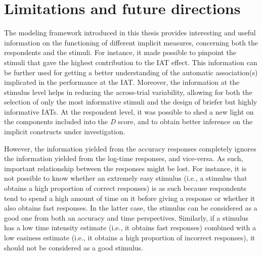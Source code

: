 \documentclass[12pt]{book}
\begin{document}
\section{Limitations and future directions}

The modeling framework introduced in this thesis provides interesting and useful information on the functioning of different implicit measures, concerning both the respondents and the stimuli. 
	For instance, it made possible to pinpoint the stimuli that gave the highest contribution to the IAT effect. This information can be further used for getting a better understanding of the automatic association(s) implicated in the performance at the IAT. 
	Moreover, the information at the stimulus level helps in reducing the across-trial variability, allowing for both the selection of only the most informative stimuli and the design of briefer but highly informative IATs.
	At the respondent level, it was possible to shed a new light on the components included into the \emph{D} score, and to obtain better inference on the implicit constructs under investigation. 


However, the information yielded from the accuracy responses completely ignores the information yielded from the log-time responses, and vice-versa. As such, important relationship between the responses might be lost. 
	For instance, it is not possible to know whether an extremely easy stimulus (i.e., a stimulus that obtains a high proportion of correct responses) is as such because respondents tend to spend a high amount of time on it before giving a response or whether it also obtains fast responses. 
	In the latter case, the stimulus can be considered as a good  one from both an accuracy and time perspectives. 
	Similarly, if a stimulus has a low time intensity estimate (i.e., it obtains fast responses) combined with a low easiness estimate (i.e., it obtains a high proportion of incorrect responses), it should not be considered as a good  stimulus. 
\end{document}
